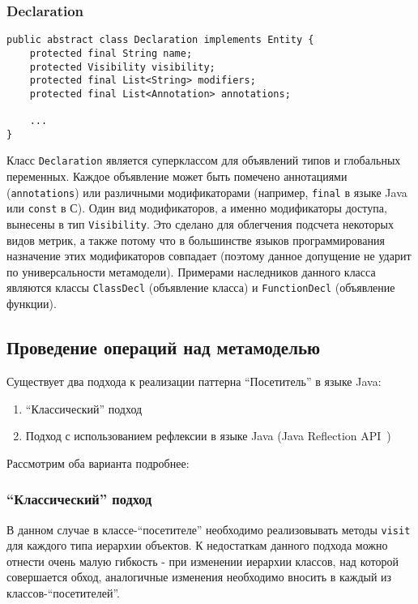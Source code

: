 \subsubsection{Declaration}

\begin{lstlisting}[caption={Класс Declaration}]
public abstract class Declaration implements Entity {
    protected final String name;
    protected Visibility visibility;
    protected final List<String> modifiers;
    protected final List<Annotation> annotations;

    ...
}
\end{lstlisting}

Класс \texttt{Declaration} является суперклассом для объявлений типов и
глобальных переменных. Каждое объявление может быть помечено аннотациями
(\texttt{annotations}) или различными модификаторами (например, \texttt{final} в
языке Java или \texttt{const} в С). Один вид модификаторов, а именно
модификаторы доступа, вынесены в тип \texttt{Visibility}. Это сделано для
облегчения подсчета некоторых видов метрик, а также потому что в большинстве
языков программирования назначение этих модификаторов совпадает (поэтому данное
допущение не ударит по универсальности метамодели). Примерами наследников
данного класса являются классы \texttt{ClassDecl} (объявление класса) и
\texttt{FunctionDecl} (объявление функции).

\vspace{10pt}
\subsection{Проведение операций над метамоделью}
\label{subsec:metamodel_operations}

Существует два подхода к реализации паттерна ``Посетитель'' в языке
Java:

\begin{enumerate}
    \item ``Классический'' подход
    \item Подход с использованием рефлексии в языке Java (Java Reflection
    API~\cite{Gosling2013})
\end{enumerate}

Рассмотрим оба варианта подробнее:

\subsubsection{``Классический'' подход}

В данном случае в классе-``посетителе'' необходимо реализовывать методы
\texttt{visit} для каждого типа иерархии объектов. К недостаткам данного подхода
можно отнести очень малую гибкость - при изменении иерархии классов, над
которой совершается обход, аналогичные изменения необходимо вносить в каждый
из классов-``посетителей''.

